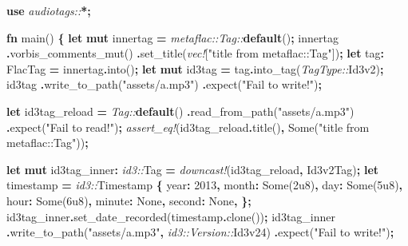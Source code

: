 \documentclass[
]{book}
\newenvironment{Shaded}{\begin{snugshade}}{\end{snugshade}}
\newcommand{\ConstantTok}[1]{\textcolor[rgb]{0.00,0.00,0.00}{#1}}
\newcommand{\DecValTok}[1]{\textcolor[rgb]{0.00,0.00,0.81}{#1}}
\newcommand{\KeywordTok}[1]{\textcolor[rgb]{0.13,0.29,0.53}{\textbf{#1}}}
\newcommand{\NormalTok}[1]{#1}
\newcommand{\OperatorTok}[1]{\textcolor[rgb]{0.81,0.36,0.00}{\textbf{#1}}}
\newcommand{\PreprocessorTok}[1]{\textcolor[rgb]{0.56,0.35,0.01}{\textit{#1}}}
\newcommand{\StringTok}[1]{\textcolor[rgb]{0.31,0.60,0.02}{#1}}
\begin{document}
\begin{Shaded}
\begin{Highlighting}[]
\KeywordTok{use} \PreprocessorTok{audiotags::}\OperatorTok{*;}

\KeywordTok{fn}\NormalTok{ main() }\OperatorTok{\{}
    \KeywordTok{let} \KeywordTok{mut}\NormalTok{ innertag }\OperatorTok{=} \PreprocessorTok{metaflac::Tag::}\KeywordTok{default}\NormalTok{()}\OperatorTok{;}
\NormalTok{    innertag}
        \OperatorTok{.}\NormalTok{vorbis\_comments\_mut()}
        \OperatorTok{.}\NormalTok{set\_title(}\PreprocessorTok{vec!}\NormalTok{[}\StringTok{"title from metaflac::Tag"}\NormalTok{])}\OperatorTok{;}
    \KeywordTok{let}\NormalTok{ tag}\OperatorTok{:}\NormalTok{ FlacTag }\OperatorTok{=}\NormalTok{ innertag}\OperatorTok{.}\NormalTok{into()}\OperatorTok{;}
    \KeywordTok{let} \KeywordTok{mut}\NormalTok{ id3tag }\OperatorTok{=}\NormalTok{ tag}\OperatorTok{.}\NormalTok{into\_tag(}\PreprocessorTok{TagType::}\NormalTok{Id3v2)}\OperatorTok{;}
\NormalTok{    id3tag}
        \OperatorTok{.}\NormalTok{write\_to\_path(}\StringTok{"assets/a.mp3"}\NormalTok{)}
        \OperatorTok{.}\NormalTok{expect(}\StringTok{"Fail to write!"}\NormalTok{)}\OperatorTok{;}

    \KeywordTok{let}\NormalTok{ id3tag\_reload }\OperatorTok{=} \PreprocessorTok{Tag::}\KeywordTok{default}\NormalTok{()}
        \OperatorTok{.}\NormalTok{read\_from\_path(}\StringTok{"assets/a.mp3"}\NormalTok{)}
        \OperatorTok{.}\NormalTok{expect(}\StringTok{"Fail to read!"}\NormalTok{)}\OperatorTok{;}
    \PreprocessorTok{assert\_eq!}\NormalTok{(id3tag\_reload}\OperatorTok{.}\NormalTok{title()}\OperatorTok{,} \ConstantTok{Some}\NormalTok{(}\StringTok{"title from metaflac::Tag"}\NormalTok{))}\OperatorTok{;}

    \KeywordTok{let} \KeywordTok{mut}\NormalTok{ id3tag\_inner}\OperatorTok{:} \PreprocessorTok{id3::}\NormalTok{Tag }\OperatorTok{=} \PreprocessorTok{downcast!}\NormalTok{(id3tag\_reload}\OperatorTok{,}\NormalTok{ Id3v2Tag)}\OperatorTok{;}
    \KeywordTok{let}\NormalTok{ timestamp }\OperatorTok{=} \PreprocessorTok{id3::}\NormalTok{Timestamp }\OperatorTok{\{}
\NormalTok{        year}\OperatorTok{:} \DecValTok{2013}\OperatorTok{,}
\NormalTok{        month}\OperatorTok{:} \ConstantTok{Some}\NormalTok{(}\DecValTok{2u8}\NormalTok{)}\OperatorTok{,}
\NormalTok{        day}\OperatorTok{:} \ConstantTok{Some}\NormalTok{(}\DecValTok{5u8}\NormalTok{)}\OperatorTok{,}
\NormalTok{        hour}\OperatorTok{:} \ConstantTok{Some}\NormalTok{(}\DecValTok{6u8}\NormalTok{)}\OperatorTok{,}
\NormalTok{        minute}\OperatorTok{:} \ConstantTok{None}\OperatorTok{,}
\NormalTok{        second}\OperatorTok{:} \ConstantTok{None}\OperatorTok{,}
    \OperatorTok{\};}
\NormalTok{    id3tag\_inner}\OperatorTok{.}\NormalTok{set\_date\_recorded(timestamp}\OperatorTok{.}\NormalTok{clone())}\OperatorTok{;}
\NormalTok{    id3tag\_inner}
        \OperatorTok{.}\NormalTok{write\_to\_path(}\StringTok{"assets/a.mp3"}\OperatorTok{,} \PreprocessorTok{id3::Version::}\NormalTok{Id3v24)}
        \OperatorTok{.}\NormalTok{expect(}\StringTok{"Fail to write!"}\NormalTok{)}\OperatorTok{;}


\end{Highlighting}
\end{Shaded}
\end{document}
